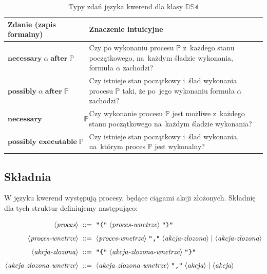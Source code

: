\documentclass[11pt,a4paper]{article}
\newcommand{\bnfchar}[1]{\texttt{\textquotedbl#1\textquotedbl}}
\newcommand{\bnfsym}[1]{\langle \textit{#1} \rangle}
\theoremstyle{definition}
\begin{document}
\begin{table}[ht]
\centering
\caption{Typy zdań języka kwerend dla klasy $\mathbb{DS4}$}
\label{tab:ds4-query-language}
\renewcommand{\arraystretch}{1.2}
\begin{tabular}{|p{}|p{}|}
\hline
\textbf{Zdanie (zapis formalny)} & \textbf{Znaczenie intuicyjne} \\ \hline

$\textbf{necessary}\; \alpha \;\textbf{after}\; \mathbb{P}$ &
Czy po wykonaniu procesu $\mathbb{P}$ z~każdego stanu początkowego, na~każdym śladzie wykonania, formuła $\alpha$ zachodzi? \\ \hline

$\textbf{possibly}\; \alpha \;\textbf{after}\; \mathbb{P}$ &
Czy istnieje stan początkowy i~ślad wykonania procesu $\mathbb{P}$ taki, że po~jego wykonaniu formuła $\alpha$ zachodzi? \\ \hline

$\textbf{necessary executable}\; \mathbb{P}$ &
Czy wykonanie procesu $\mathbb{P}$ jest możliwe z~każdego stanu początkowego na~każdym śladzie wykonania? \\ \hline

$\textbf{possibly executable}\; \mathbb{P}$ &
Czy istnieje stan początkowy i~ślad wykonania, na~którym proces $\mathbb{P}$ jest wykonalny? \\ \hline

\end{tabular}
\end{table}

\subsection{Składnia}

W języku kwerend występują procesy, będące ciągami akcji złożonych. Składnię dla tych struktur definiujemy następująco:

\begin{align*}
    \bnfsym{proces} \;::=\;&  \; 
    \bnfchar{(} \; \bnfsym{proces-wnetrze} \; \bnfchar{)} \; \\[4pt]
    \bnfsym{proces-wnetrze} \;::=\;&  \; 
    \bnfsym{proces-wnetrze} \; \bnfchar{,} \; \bnfsym{akcja-zlozona} \; | \; \bnfsym{akcja-zlozona} \\[4pt]
    \bnfsym{akcja-zlozona} \;::=\;&  \; 
    \bnfchar{\{} \; \bnfsym{akcja-zlozona-wnetrze} \; \bnfchar{\}} \; \\[4pt]
    \bnfsym{akcja-zlozona-wnetrze} \;::=\;&  \; 
    \bnfsym{akcja-zlozona-wnetrze} \; \bnfchar{,} \; \bnfsym{akcja} \; | \; \bnfsym{akcja} \\[4pt]
\end{align*}
\end{document}
